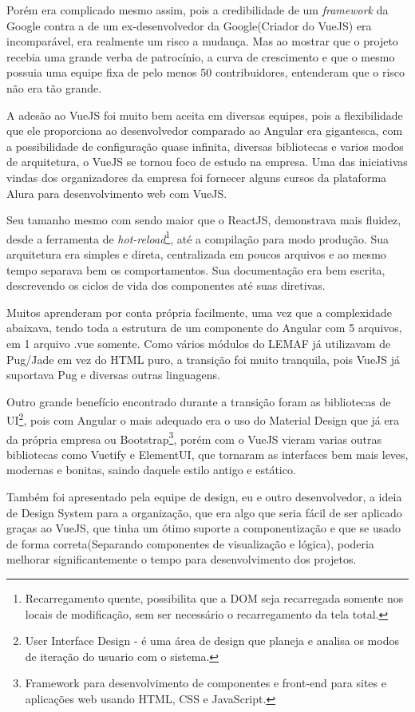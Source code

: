 Porém era complicado mesmo assim, pois a credibilidade de um \textit{framework} da Google contra a de um ex-desenvolvedor da Google(Criador do VueJS) era incomparável, era realmente um risco a mudança. 
Mas ao mostrar que o projeto recebia uma grande verba de patrocínio, a curva de crescimento e que o mesmo possuia uma equipe fixa de pelo menos 50 contribuidores, entenderam que o risco não era tão grande.

A adesão ao VueJS foi muito bem aceita em diversas equipes, pois a flexibilidade que ele proporciona ao desenvolvedor comparado ao Angular era gigantesca, com a possibilidade de configuração quase infinita, diversas bibliotecas e varios modos de arquitetura, o VueJS se tornou foco de estudo na empresa.
Uma das iniciativas vindas dos organizadores da empresa foi fornecer alguns cursos da plataforma Alura para desenvolvimento web com VueJS.

Seu tamanho mesmo com sendo maior que o ReactJS, demonstrava mais fluidez, desde a ferramenta de \textit{hot-reload}\footnote{Recarregamento quente, possibilita que a DOM seja recarregada somente nos locais de modificação, sem ser necessário o recarregamento da tela total.}, até a compilação para modo produção.
Sua arquitetura era simples e direta, centralizada em poucos arquivos e ao mesmo tempo separava bem os comportamentos. Sua documentação era bem escrita, descrevendo os ciclos de vida dos componentes até suas diretivas.

Muitos aprenderam por conta própria facilmente, uma vez que a complexidade abaixava, tendo toda a estrutura de um componente do Angular com 5 arquivos, em 1 arquivo .vue somente.
Como vários módulos do LEMAF já utilizavam de Pug/Jade em vez do HTML puro, a transição foi muito tranquila, pois VueJS já suportava Pug e diversas outras linguagens.

Outro grande benefício encontrado durante a transição foram as bibliotecas de UI\footnote{User Interface Design - é uma área de design que planeja e analisa os modos de iteração do usuario com o sistema.}, pois com Angular o mais adequado era o uso do Material Design que já era da própria empresa ou 
Bootstrap\footnote{Framework para desenvolvimento de componentes e front-end para sites e aplicações web usando HTML, CSS e JavaScript.}, porém com o VueJS vieram varias outras bibliotecas como Vuetify e ElementUI, que tornaram as interfaces bem mais leves, modernas e bonitas, saindo daquele estilo antigo e estático.

Também foi apresentado pela equipe de design, eu e outro desenvolvedor, a ideia de Design System para a organização, que era algo que seria fácil de ser aplicado graças ao VueJS, que tinha um ótimo suporte a componentização e que se usado 
de forma correta(Separando componentes de visualização e lógica), poderia melhorar significantemente o tempo para desenvolvimento dos projetos.


